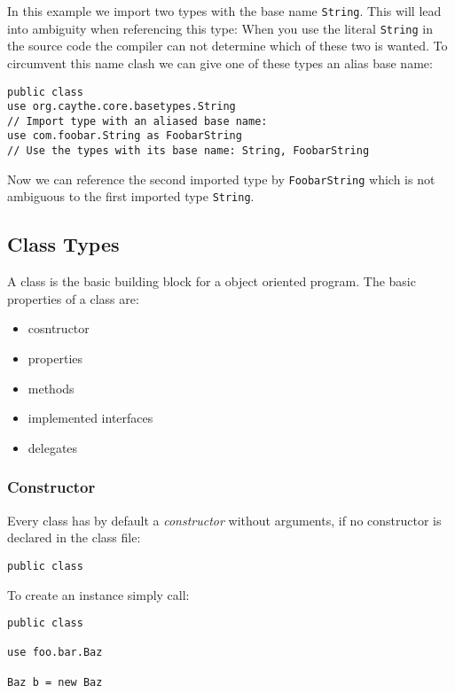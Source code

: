 \documentclass[11pt,a4paper]{report}
\begin{document}
In this example we import two types with the base name \texttt{String}. This will lead into ambiguity when referencing this type: When you use the literal \texttt{String} in the source code the compiler can not determine which of these two is wanted. To circumvent this name clash we can give one of these types an alias base name:

\begin{lstlisting}[language=CayThe, title=Module source file foo/bar/Baz.ct]
public class
use org.caythe.core.basetypes.String
// Import type with an aliased base name:
use com.foobar.String as FoobarString
// Use the types with its base name: String, FoobarString
\end{lstlisting}

Now we can reference the second imported type by \texttt{FoobarString} which is not ambiguous to the first imported type \texttt{String}.

\subsection{Class Types}

A class is the basic building block for a object oriented program. The basic properties of a class are:

\begin{itemize}
    \item cosntructor
    \item properties
    \item methods
    \item implemented interfaces
    \item delegates
\end{itemize}

\subsubsection{Constructor}

Every class has by default a \textit{constructor} without arguments, if no constructor is declared in the class file:

\begin{lstlisting}[language=CayThe, title=Type foo.bar.Baz with no argument constructor]
public class    
\end{lstlisting}

To create an instance simply call:

\begin{lstlisting}[language=CayThe, title=Make an instance of foo.bar.Baz]
public class

use foo.bar.Baz

Baz b = new Baz
\end{lstlisting}
\end{document}
